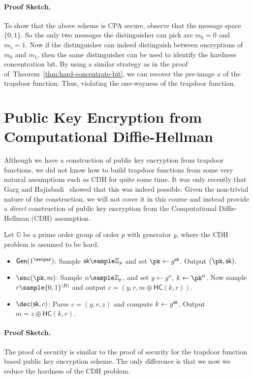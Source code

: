 \paragraph{Proof Sketch.} To show that the above scheme is CPA secure, observe that the message space $\{0,1\}$. So the only two messages the distinguisher can pick are $m_0=0$ and $m_1=1$. Now if the distinguisher can indeed distinguish between encryptions of $m_0$ and $m_1$, then the same distinguisher can be used to identify the hardness concentration bit. By using a similar strategy as in the proof of~Theorem~\ref{thm:hard-concentrate-bit}, we can recover the pre-image $x$ of the trapdoor function. Thus, violating the one-wayness of the trapdoor function.

\section{Public Key Encryption from Computational Diffie-Hellman}
Although we have a construction of public key encryption from trapdoor functions, we did not know how to build trapdoor functions from some very natural assumptions such as CDH for quite some time. It was only recently that Garg and Hajiabadi~\cite{C:GarHaj18} 
showed that this was indeed possible. Given the non-trivial nature of the construction, we will not cover it in this course and instead provide a \emph{direct} construction of public key encryption from the Computational Diffie-Hellman (CDH) assumption.

Let $\mathbb{G}$ be a prime order group of order $p$ with generator $g$, where the CDH problem is assumed to be hard.
\begin{itemize}
    \item $\gen(1^\secpar)$: Sample $\sk \sample \mathbb{Z}_p$ and set $\pk \gets g^\sk$. Output $(\pk, \sk)$.
    \item $\enc(\pk, m)$: Sample $\alpha \sample \mathbb{Z}_p$, and set $y \gets g^\alpha$, $k \gets \pk^\alpha$. Now sample $r \sample \{0,1\}^{|B|}$ and output $c = (y, r, m \oplus \mathsf{HC}(k, r))$.
    \item $\dec(\sk, c)$: Parse $c = (y, r, z)$ and compute $k \gets y^{\mathsf{sk}}$. Output $m = z \oplus \mathsf{HC}(k, r)$.
\end{itemize}

\paragraph{Proof Sketch.} The proof of security is similar to the proof of security for the trapdoor function based public key encryption scheme. The only difference is that we now we reduce the hardness of the CDH problem.

